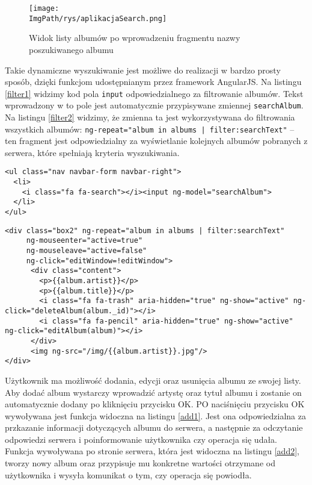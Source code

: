 \documentclass[a4paper,12pt,twoside,openany]{report}
\newcommand{\ImgPath}{.}
\begin{document}
\begin{figure}[!htbp]
	\begin{center}
\centering
\texttt{[image: \\ImgPath/rys/aplikacjaSearch.png]}
\end{center}
	\caption{Widok listy albumów po wprowadzeniu fragmentu nazwy poszukiwanego albumu}
	\label{aplikacjaSearch}
\end{figure}

Takie dynamiczne wyszukiwanie jest możliwe do realizacji w bardzo prosty sposób, dzięki funkcjom udostępnianym przez framework AngularJS.
Na listingu \ref{filter1} widzimy kod pola \texttt{input} odpowiedzialnego za filtrowanie albumów.
Tekst wprowadzony w to pole jest automatycznie przypisywane zmiennej \texttt{searchAlbum}.
Na listingu \ref{filter2} widzimy, że zmienna ta jest wykorzystywana do filtrowania wszystkich albumów: \texttt{ng-repeat="album in albums | filter:searchText"} -- ten fragment jest odpowiedzialny za wyświetlanie kolejnych albumów pobranych z serwera, które spełniają kryteria wyszukiwania.

\begin{lstlisting}[caption=Kod filtra w pasku nawigacyjnym aplikacji, label=filter1]
<ul class="nav navbar-form navbar-right">
  <li>
    <i class="fa fa-search"></i><input ng-model="searchAlbum">
  </li>
</ul>
\end{lstlisting}
\begin{lstlisting}[caption=Kod odpowiedzialny za wyświetlanie albumów, label=filter2]
<div class="box2" ng-repeat="album in albums | filter:searchText"
     ng-mouseenter="active=true"
     ng-mouseleave="active=false"
     ng-click="editWindow=!editWindow">
      <div class="content">
        <p>{{album.artist}}</p>
        <p>{{album.title}}</p>
        <i class="fa fa-trash" aria-hidden="true" ng-show="active" ng-click="deleteAlbum(album._id)"></i>
        <i class="fa fa-pencil" aria-hidden="true" ng-show="active" ng-click="editAlbum(album)"></i>
      </div>
      <img ng-src="/img/{{album.artist}}.jpg"/>
</div>
\end{lstlisting}

Użytkownik ma możliwość dodania, edycji oraz usunięcia albumu ze swojej listy.
Aby dodać album wystarczy wprowadzić artystę oraz tytuł albumu i zostanie on automatycznie dodany po kliknięciu przycisku OK.
PO naciśnięciu przycisku OK wywoływana jest funkcja widoczna na listingu \ref{add1}.
Jest ona odpowiedzialna za przkazanie informacji dotyczących albumu do serwera, a następnie za odczytanie odpowiedzi serwera i poinformowanie użytkownika czy operacja się udała.
Funkcja wywoływana po stronie serwera, która jest widoczna na listingu \ref{add2}, tworzy nowy album oraz przypisuje mu konkretne wartości otrzymane od użytkownika i wysyła komunikat o tym, czy operacja się powiodła.
\end{document}
